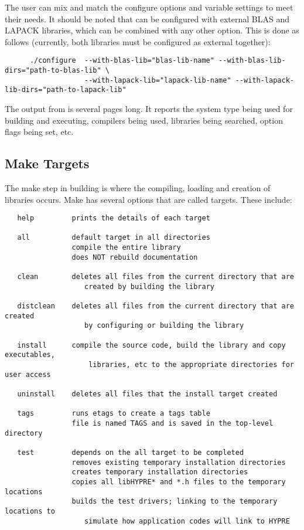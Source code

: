 The user can mix and match the configure options and variable settings to meet
their needs.  It should be noted that \hypre{} can be configured with external
BLAS and LAPACK libraries, which can be combined with any other option.  This is
done as follows (currently, both libraries must be configured as external
together):

\begin{verbatim}
      ./configure  --with-blas-lib="blas-lib-name" --with-blas-lib-dirs="path-to-blas-lib" \
                   --with-lapack-lib="lapack-lib-name" --with-lapack-lib-dirs="path-to-lapack-lib"
\end{verbatim}

The output from  is several pages long.  It reports the system
type being used for building and executing, compilers being used, libraries
being searched, option flags being set, etc.


\subsection{Make Targets}

The make step in building \hypre{} is where the compiling, loading and creation
of libraries occurs.  Make has several options that are called targets.  These
include:
\begin{verbatim}
   help         prints the details of each target

   all          default target in all directories
                compile the entire library
                does NOT rebuild documentation

   clean        deletes all files from the current directory that are 
                   created by building the library

   distclean    deletes all files from the current directory that are created
                   by configuring or building the library

   install      compile the source code, build the library and copy executables,
                    libraries, etc to the appropriate directories for user access

   uninstall    deletes all files that the install target created

   tags         runs etags to create a tags table
                file is named TAGS and is saved in the top-level directory

   test         depends on the all target to be completed
                removes existing temporary installation directories
                creates temporary installation directories
                copies all libHYPRE* and *.h files to the temporary locations
                builds the test drivers; linking to the temporary locations to
                   simulate how application codes will link to HYPRE
\end{verbatim}

